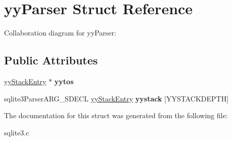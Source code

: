 \hypertarget{structyyParser}{}\section{yy\+Parser Struct Reference}
\label{structyyParser}


Collaboration diagram for yy\+Parser\+:
\subsection*{Public Attributes}
\begin{DoxyCompactItemize}
\item 
\hyperlink{structyyStackEntry}{yy\+Stack\+Entry} $\ast$ {\bfseries yytos}\hypertarget{structyyParser_aa00139fa506498c5b8539d502d8052f0}{}\label{structyyParser_aa00139fa506498c5b8539d502d8052f0}

\item 
sqlite3\+Parser\+A\+R\+G\+\_\+\+S\+D\+E\+CL \hyperlink{structyyStackEntry}{yy\+Stack\+Entry} {\bfseries yystack} \mbox{[}Y\+Y\+S\+T\+A\+C\+K\+D\+E\+P\+TH\mbox{]}\hypertarget{structyyParser_ae8bc1531d6ae56020a7ee33a40783672}{}\label{structyyParser_ae8bc1531d6ae56020a7ee33a40783672}

\end{DoxyCompactItemize}


The documentation for this struct was generated from the following file\+:\begin{DoxyCompactItemize}
\item 
sqlite3.\+c\end{DoxyCompactItemize}
